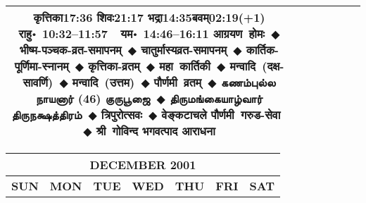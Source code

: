 \documentclass[a3paper,12pt,landscape]{article}
\newcommand{\eventsep}{~$\Diamondblack$ }
\newcommand{\To}{\hspace{1pt}\raisebox{0pt}{\tiny\RIGHTarrow}\hspace{1pt}}
\newcommand{\tamil}[1]{%
{\fontspec[Scale=0.9,FakeStretch=0.9]{Noto Sans Tamil} \footnotesize #1}}
\newcommand{\rahuyama}[2]{%
{राहु॰~\textsf{#1}~~यम॰~\textsf{#2}}
}
\begin{document}
\begin{center}
\begin{tabular}{|c|c|c|c|c|c|c|}
{{\mbox{कृत्तिका\To{}\textsf{17:36\hspace{2ex}}}}%
{\mbox{शिवः\To{}\textsf{21:17\hspace{2ex}}}}%
{\mbox{भद्रा\To{}\textsf{14:35\hspace{2ex}}}\mbox{बवम्\To{}\textsf{02:19(+1)\hspace{2ex}}}}}%
{\rahuyama{10:32--11:57}{14:46--16:11}}%
{आग्रयण~होमः\eventsep भीष्म-पञ्चक-व्रत-समापनम्\eventsep चातुर्मास्यव्रत-समापनम्\eventsep कार्तिक-पूर्णिमा-स्नानम्\eventsep कृत्तिका-व्रतम्\eventsep महा~कार्तिकी\eventsep मन्वादि~(दक्ष-सावर्णि)\eventsep मन्वादि~(उत्तम)\eventsep पौर्णमी~व्रतम्\eventsep \tamil{கணம்புல்ல நாயனார் (46) குருபூஜை}\eventsep \tamil{திருமங்கையாழ்வார் திருநக்ஷத்திரம்}\eventsep त्रिपुरोत्सवः\eventsep वेङ्कटाचले पौर्णमी~गरुड-सेवा\eventsep श्री~गोविन्द भगवत्पाद आराधना}
&
\\ \hline
\end{tabular}



\begin{tabular}{|c|c|c|c|c|c|c|}
\multicolumn{7}{c}{\Large \bfseries \sffamily DECEMBER 2001}\\[3mm]
\hline
\textbf{\textsf{SUN}} & \textbf{\textsf{MON}} & \textbf{\textsf{TUE}} & \textbf{\textsf{WED}} & \textbf{\textsf{THU}} & \textbf{\textsf{FRI}} & \textbf{\textsf{SAT}} \\ \hline


\end{tabular}
\end{center}
\end{document}
